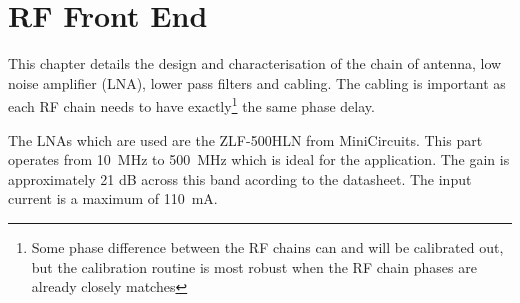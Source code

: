 \chapter{RF Front End}
\label{ch:rf-front-end}

This chapter details the design and characterisation of the chain of antenna, low noise amplifier (LNA), lower pass filters and cabling. The cabling is important as each RF chain needs to have exactly\footnote{Some phase difference between the RF chains can and will be calibrated out, but the calibration routine is most robust when the RF chain phases are already closely matches} the same phase delay.

The LNAs which are used are the ZLF-500HLN from MiniCircuits. This part operates from \SI{10}{\mega\hertz} to \SI{500}{\mega\hertz} which is ideal for the application. The gain is approximately 21 dB across this band acording to the datasheet. The input current is a maximum of \SI{110}{\milli\ampere}.


